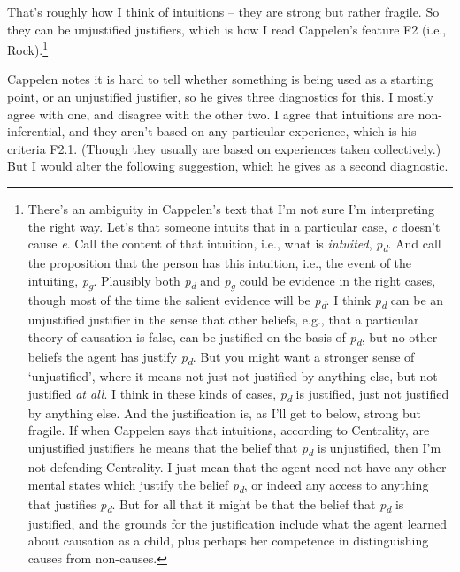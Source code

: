 \documentclass[
  11pt,
  letterpaper,
  DIV=11,
  numbers=noendperiod,
  twoside]{scrartcl}
\begin{document}
That's roughly how I think of intuitions -- they are strong but rather
fragile. So they can be unjustified justifiers, which is how I read
Cappelen's feature F2 (i.e., Rock).\footnote{There's an ambiguity in
  Cappelen's text that I'm not sure I'm interpreting the right way.
  Let's that someone intuits that in a particular case, \emph{c} doesn't
  cause \emph{e}. Call the content of that intuition, i.e., what is
  \emph{intuited}, \emph{p\textsubscript{d}}. And call the proposition
  that the person has this intuition, i.e., the event of the intuiting,
  \emph{p\textsubscript{g}}. Plausibly both \emph{p\textsubscript{d}}
  and \emph{p\textsubscript{g}} could be evidence in the right cases,
  though most of the time the salient evidence will be
  \emph{p\textsubscript{d}}. I think \emph{p\textsubscript{d}} can be an
  unjustified justifier in the sense that other beliefs, e.g., that a
  particular theory of causation is false, can be justified on the basis
  of \emph{p\textsubscript{d}}, but no other beliefs the agent has
  justify \emph{p\textsubscript{d}}. But you might want a stronger sense
  of `unjustified', where it means not just not justified by anything
  else, but not justified \emph{at all}. I think in these kinds of
  cases, \emph{p\textsubscript{d}} is justified, just not justified by
  anything else. And the justification is, as I'll get to below, strong
  but fragile. If when Cappelen says that intuitions, according to
  Centrality, are unjustified justifiers he means that the belief that
  \emph{p\textsubscript{d}} is unjustified, then I'm not defending
  Centrality. I just mean that the agent need not have any other mental
  states which justify the belief \emph{p\textsubscript{d}}, or indeed
  any access to anything that justifies \emph{p\textsubscript{d}}. But
  for all that it might be that the belief that
  \emph{p\textsubscript{d}} is justified, and the grounds for the
  justification include what the agent learned about causation as a
  child, plus perhaps her competence in distinguishing causes from
  non-causes.}

Cappelen notes it is hard to tell whether something is being used as a
starting point, or an unjustified justifier, so he gives three
diagnostics for this. I mostly agree with one, and disagree with the
other two. I agree that intuitions are non-inferential, and they aren't
based on any particular experience, which is his criteria F2.1. (Though
they usually are based on experiences taken collectively.) But I would
alter the following suggestion, which he gives as a second diagnostic.
\end{document}
